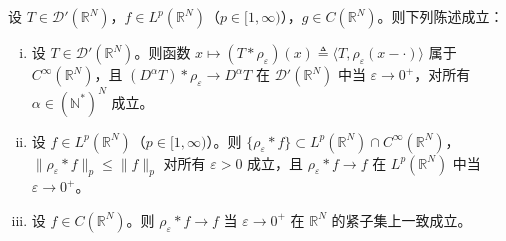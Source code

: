 \documentclass[../../main.tex]{subfiles}%
\begin{document}
\begin{proposition}\label{proposition:ch03-磨光逼近}\label{proposition:ch03-磨光性质}
设 $T\in\mathcal{D}'(\mathbb{R}^N)$，$f\in L^p(\mathbb{R}^N)$（$p\in[1,\infty)$），$g\in C(\mathbb{R}^N)$。则下列陈述成立：
\begin{enumerate}[(i)]
\item 设 $T\in\mathcal{D}'(\mathbb{R}^N)$。则函数 $x\mapsto(T*\rho_\varepsilon)(x)\triangleq\langle T,\rho_\varepsilon(x-\cdot)\rangle$ 属于 $C^\infty(\mathbb{R}^N)$，且 $(D^\alpha T)*\rho_\varepsilon\to D^\alpha T$ 在 $\mathcal{D}'(\mathbb{R}^N)$ 中当 $\varepsilon\to0^+$，对所有 $\alpha\in(\mathbb{N}^*)^N$ 成立。
\item 设 $f\in L^p(\mathbb{R}^N)$（$p\in[1,\infty)$）。则 $\{\rho_\varepsilon*f\}\subset L^p(\mathbb{R}^N)\cap C^\infty(\mathbb{R}^N)$，$\|\rho_\varepsilon*f\|_p\leqslant\|f\|_p$ 对所有 $\varepsilon>0$ 成立，且 $\rho_\varepsilon*f\to f$ 在 $L^p(\mathbb{R}^N)$ 中当 $\varepsilon\to0^+$。
\item 设 $f\in C(\mathbb{R}^N)$。则 $\rho_\varepsilon*f\to f$ 当 $\varepsilon\to0^+$ 在 $\mathbb{R}^N$ 的紧子集上一致成立。
\end{enumerate}
\end{proposition}
\end{document}
